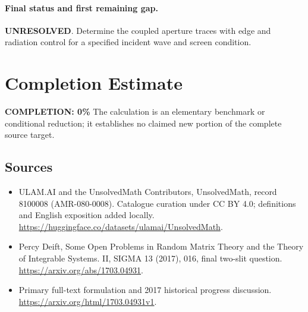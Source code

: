\documentclass[11pt]{article}
\begin{document}
\paragraph{Final status and first remaining gap.}
\textbf{UNRESOLVED}. Determine the coupled aperture traces with edge and radiation control for a specified incident wave and screen condition.

\section{Completion Estimate}
\noindent\textbf{COMPLETION: 0\%}
The calculation is an elementary benchmark or conditional reduction; it establishes no claimed new portion of the complete source target.

\subsection{Sources}
\begin{itemize}
\item[\hypertarget{source:8100008:1}{S1}] ULAM.AI and the UnsolvedMath Contributors, UnsolvedMath, record 8100008 (AMR-080-0008). Catalogue curation under CC BY 4.0; definitions and English exposition added locally.
\url{https://huggingface.co/datasets/ulamai/UnsolvedMath}.
\item[\hypertarget{source:8100008:2}{S2}] Percy Deift, Some Open Problems in Random Matrix Theory and the Theory of Integrable Systems. II, SIGMA 13 (2017), 016, final two-slit question.
\url{https://arxiv.org/abs/1703.04931}.
\item[\hypertarget{source:8100008:3}{S3}] Primary full-text formulation and 2017 historical progress discussion.
\url{https://arxiv.org/html/1703.04931v1}.
\end{itemize}
\label{end:8100008}
\end{document}
